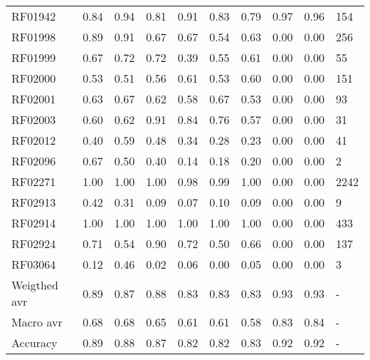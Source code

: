 \begin{tabular}{lrrrrrrrrl}
RF01942      &  0.84 &  0.94 &  0.81 &   0.91 &    0.83 &     0.79 &  0.97 & 0.96 &        154 \\
RF01998      &  0.89 &  0.91 &  0.67 &   0.67 &    0.54 &     0.63 &  0.00 & 0.00 &        256 \\
RF01999      &  0.67 &  0.72 &  0.72 &   0.39 &    0.55 &     0.61 &  0.00 & 0.00 &         55 \\
RF02000      &  0.53 &  0.51 &  0.56 &   0.61 &    0.53 &     0.60 &  0.00 & 0.00 &        151 \\
RF02001      &  0.63 &  0.67 &  0.62 &   0.58 &    0.67 &     0.53 &  0.00 & 0.00 &         93 \\
RF02003      &  0.60 &  0.62 &  0.91 &   0.84 &    0.76 &     0.57 &  0.00 & 0.00 &         31 \\
RF02012      &  0.40 &  0.59 &  0.48 &   0.34 &    0.28 &     0.23 &  0.00 & 0.00 &         41 \\
RF02096      &  0.67 &  0.50 &  0.40 &   0.14 &    0.18 &     0.20 &  0.00 & 0.00 &          2 \\
RF02271      &  1.00 &  1.00 &  1.00 &   0.98 &    0.99 &     1.00 &  0.00 & 0.00 &       2242 \\
RF02913      &  0.42 &  0.31 &  0.09 &   0.07 &    0.10 &     0.09 &  0.00 & 0.00 &          9 \\
RF02914      &  1.00 &  1.00 &  1.00 &   1.00 &    1.00 &     1.00 &  0.00 & 0.00 &        433 \\
RF02924      &  0.71 &  0.54 &  0.90 &   0.72 &    0.50 &     0.66 &  0.00 & 0.00 &        137 \\
RF03064      &  0.12 &  0.46 &  0.02 &   0.06 &    0.00 &     0.05 &  0.00 & 0.00 &          3 \\
Weigthed avr &  0.89 &  0.87 &  0.88 &   0.83 &    0.83 &     0.83 &  0.93 & 0.93 &          - \\
Macro avr    &  0.68 &  0.68 &  0.65 &   0.61 &    0.61 &     0.58 &  0.83 & 0.84 &          - \\
Accuracy     &  0.89 &  0.88 &  0.87 &   0.82 &    0.82 &     0.83 &  0.92 & 0.92 &          - \\
\bottomrule
\end{tabular}

